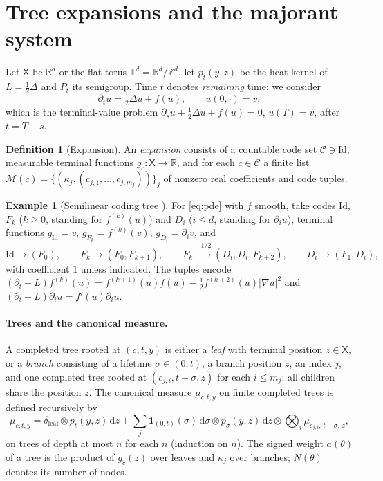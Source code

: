 \documentclass[11pt]{article}
\theoremstyle{definition}
\newtheorem{definition}[theorem]{Definition}
\newtheorem{example}[theorem]{Example}
\theoremstyle{remark}
\newcommand{\R}{\mathbb{R}}
\newcommand{\X}{\mathsf{X}}
\newcommand{\C}{\mathcal{C}}
\newcommand{\M}{\mathcal{M}}
\newcommand{\T}{\mathbb{T}}
\newcommand{\Id}{\mathrm{Id}}
\newcommand{\dd}{\,\mathrm{d}}
\begin{document}
\section{Tree expansions and the majorant system}\label{sec:setting}

Let $\X$ be $\R^d$ or the flat torus $\T^d=\R^d/\mathbb{Z}^d$, let
$p_t(y,z)$ be the heat kernel of $L=\frac12\Delta$ and $P_t$ its semigroup.
Time $t$ denotes \emph{remaining} time: we consider
\begin{equation}\label{eq:pde}
\partial_t u=\tfrac12\Delta u+f(u),\qquad u(0,\cdot)=v,
\end{equation}
which is the terminal-value problem
$\partial_s u+\frac12\Delta u+f(u)=0$, $u(T)=v$, after $t=T-s$.

\begin{definition}[Expansion]
An \emph{expansion} consists of a countable code set $\C\ni\Id$,
measurable terminal functions $g_c:\X\to\R$, and for each $c\in\C$ a
finite list $\M(c)=\{(\kappa_j,(c_{j,1},\dots,c_{j,m_j}))\}_j$ of nonzero
real coefficients and code tuples.
\end{definition}

\begin{example}[Semilinear coding tree \cite{NPP23}]\label{ex:semilinear}
For \eqref{eq:pde} with $f$ smooth, take codes $\Id$, $F_k$ ($k\ge0$,
standing for $f^{(k)}(u)$) and $D_i$ ($i\le d$, standing for
$\partial_iu$), terminal functions $g_\Id=v$, $g_{F_k}=f^{(k)}(v)$,
$g_{D_i}=\partial_iv$, and
\[
\Id\to(F_0),\qquad
F_k\to(F_0,F_{k+1}),\qquad
F_k\xrightarrow{-1/2}(D_i,D_i,F_{k+2}),\qquad
D_i\to(F_1,D_i),
\]
with coefficient $1$ unless indicated. The tuples encode
$(\partial_t-L)f^{(k)}(u)=f^{(k+1)}(u)f(u)-\frac12f^{(k+2)}(u)|\nabla u|^2$
and $(\partial_t-L)\partial_iu=f'(u)\partial_iu$.
\end{example}

\paragraph{Trees and the canonical measure.}
A completed tree rooted at $(c,t,y)$ is either a \emph{leaf} with terminal
position $z\in\X$, or a \emph{branch} consisting of a lifetime
$\sigma\in(0,t)$, a branch position $z$, an index $j$, and one completed
tree rooted at $(c_{j,i},t-\sigma,z)$ for each $i\le m_j$; all children
share the position $z$. The canonical measure $\mu_{c,t,y}$ on finite
completed trees is defined recursively by
\[
\mu_{c,t,y}=\delta_{\mathrm{leaf}}\otimes p_t(y,z)\dd z
+\sum_j \mathbf 1_{(0,t)}(\sigma)\dd\sigma\otimes p_\sigma(y,z)\dd z\otimes
\bigotimes_{i}\mu_{c_{j,i},\,t-\sigma,\,z},
\]
on trees of depth at most $n$ for each $n$ (induction on $n$). The signed
weight $a(\theta)$ of a tree is the product of $g_c(z)$ over leaves and
$\kappa_j$ over branches; $N(\theta)$ denotes its number of nodes.
\end{document}
